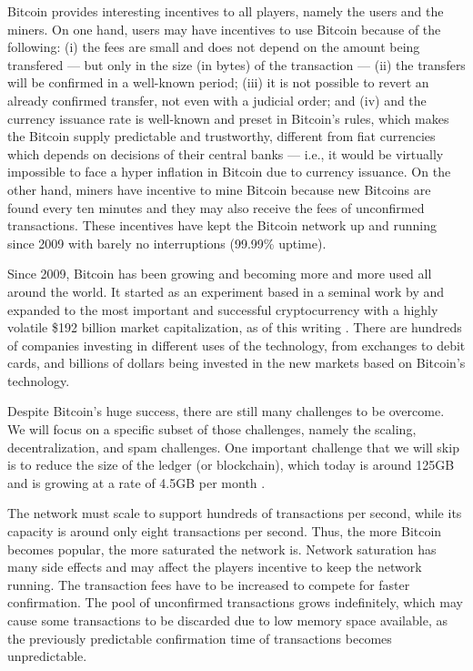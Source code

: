 Bitcoin provides interesting incentives to all players, namely the users and the miners. On one hand, users may have incentives to use Bitcoin because of the following: (i) the fees are small and does not depend on the amount being transfered --- but only in the size (in bytes) of the transaction --- (ii) the transfers will be confirmed in a well-known period; (iii) it is not possible to revert an already confirmed transfer, not even with a judicial order; and (iv) and the currency issuance rate is well-known and preset in Bitcoin's rules, which makes the Bitcoin supply predictable and trustworthy, different from fiat currencies which depends on decisions of their central banks --- i.e., it would be virtually impossible to face a hyper inflation in Bitcoin due to currency issuance. On the other hand, miners have incentive to mine Bitcoin because new Bitcoins are found every ten minutes and they may also receive the fees of unconfirmed transactions. These incentives have kept the Bitcoin network up and running since 2009 with barely no interruptions (99.99\% uptime).

Since 2009, Bitcoin has been growing and becoming more and more used all around the world. It started as an experiment based in a seminal work by \citet{nakamoto2008bitcoin} and expanded to the most important and successful cryptocurrency with a highly volatile \$192 billion market capitalization, as of this writing \citep{coinmarketcapbtc}. There are hundreds of companies investing in different uses of the technology, from exchanges to debit cards, and billions of dollars being invested in the new markets based on Bitcoin's technology.

Despite Bitcoin's huge success, there are still many challenges to be overcome. We will focus on a specific subset of those challenges, namely the scaling, decentralization, and spam challenges. One important challenge that we will skip is to reduce the size of the ledger (or blockchain), which today is around 125GB and is growing at a rate of 4.5GB per month \citep{blockchaininfosize}.

The network must scale to support hundreds of transactions per second, while its capacity is around only eight transactions per second. Thus, the more Bitcoin becomes popular, the more saturated the network is. Network saturation has many side effects and may affect the players incentive to keep the network running. The transaction fees have to be increased to compete for faster confirmation. The pool of unconfirmed transactions grows indefinitely, which may cause some transactions to be discarded due to low memory space available, as the previously predictable confirmation time of transactions becomes unpredictable.

